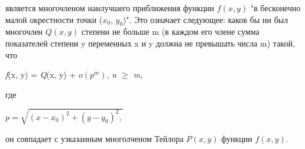 \documentclass{article}
\begin{document}
	является многочленом наилучшего приближения функции $f(x, y)$ "в бесконечно малой
	окрестности точки ($x_0$, $y_0$)". Это означает следующее: каков бы ни был многочлен $Q(x, y)$ степени
	не больше m (в каждом его члене сумма показателей степени y переменных x и y должна не превышать числа m) такой, что

	\textit {f}(x, y) = \textit{Q}(x, y) + $o(p^m)$, \textit{n $\geq$ m,}


	где
		
		$p=\sqrt{(x - x_0)^2 + (y-y_0)^2,}$

	он совпадает с узказанным многолченом Тейлора $P(x, y)$ функции $f(x,y)$.
 
\end{document}
